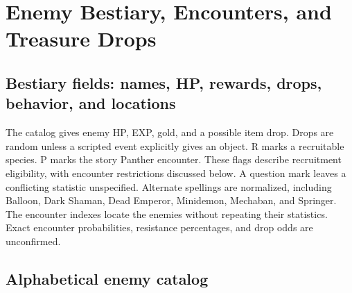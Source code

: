 \chapter{Enemy Bestiary, Encounters, and Treasure Drops}
\label{written-bestiary}

\section{Bestiary fields: names, HP, rewards, drops, behavior, and locations}
The catalog gives enemy HP, EXP, gold, and a possible item drop. Drops are random unless a scripted event explicitly gives an object. R marks a recruitable species. P marks the story Panther encounter. These flags describe recruitment eligibility, with encounter restrictions discussed below. A question mark leaves a conflicting statistic unspecified. Alternate spellings are normalized, including Balloon, Dark Shaman, Dead Emperor, Minidemon, Mechaban, and Springer. The encounter indexes locate the enemies without repeating their statistics. Exact encounter probabilities, resistance percentages, and drop odds are unconfirmed.

\section{Alphabetical enemy catalog}

